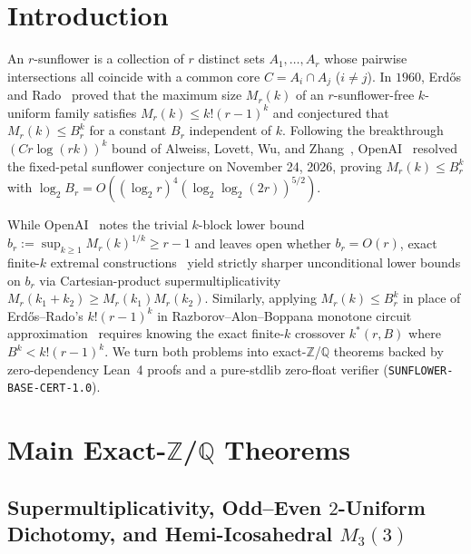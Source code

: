 \documentclass[11pt,a4paper]{article}
\theoremstyle{definition}
\theoremstyle{remark}
\newcommand{\QQ}{\mathbb{Q}}
\newcommand{\ZZ}{\mathbb{Z}}
\newcommand{\certschema}{\texttt{SUNFLOWER-BASE-CERT-1.0}}
\begin{document}
\section{Introduction}

An $r$-sunflower is a collection of $r$ distinct sets $A_1,\dots,A_r$ whose pairwise intersections all coincide with a common core $C = A_i \cap A_j$ ($i \neq j$). In $1960$, Erd\H{o}s and Rado~\cite{erdos1960intersection} proved that the maximum size $M_r(k)$ of an $r$-sunflower-free $k$-uniform family satisfies $M_r(k) \le k!(r-1)^k$ and conjectured that $M_r(k) \le B_r^k$ for a constant $B_r$ independent of $k$. Following the breakthrough $(C r \log(rk))^k$ bound of Alweiss, Lovett, Wu, and Zhang~\cite{alweiss2021improved}, OpenAI~\cite{openai2026sunflowers} resolved the fixed-petal sunflower conjecture on November 24, 2026, proving $M_r(k) \le B_r^k$ with $\log_2 B_r = O((\log_2 r)^4 (\log_2\log_2(2r))^{5/2})$.

While OpenAI~\cite{openai2026sunflowers} notes the trivial $k$-block lower bound $b_r := \sup_{k\ge 1} M_r(k)^{1/k} \ge r - 1$ and leaves open whether $b_r = O(r)$, exact finite-$k$ extremal constructions~\cite{abbott1972intersection} yield strictly sharper unconditional lower bounds on $b_r$ via Cartesian-product supermultiplicativity $M_r(k_1 + k_2) \ge M_r(k_1) M_r(k_2)$. Similarly, applying $M_r(k) \le B_r^k$ in place of Erd\H{o}s--Rado's $k!(r-1)^k$ in Razborov--Alon--Boppana monotone circuit approximation~\cite{razborov1985lower,alon1987monotone} requires knowing the exact finite-$k$ crossover $k^*(r, B)$ where $B^k < k!(r-1)^k$. We turn both problems into exact-$\ZZ$/$\QQ$ theorems backed by zero-dependency Lean~4 proofs and a pure-stdlib zero-float verifier (\certschema{}).

\section{Main Exact-\texorpdfstring{$\ZZ$}{Z}/\texorpdfstring{$\QQ$}{Q} Theorems}\label{sec:results}

\subsection{Supermultiplicativity, Odd--Even \texorpdfstring{$2$}{2}-Uniform Dichotomy, and Hemi-Icosahedral \texorpdfstring{$M_3(3)$}{M3(3)}}
\end{document}
